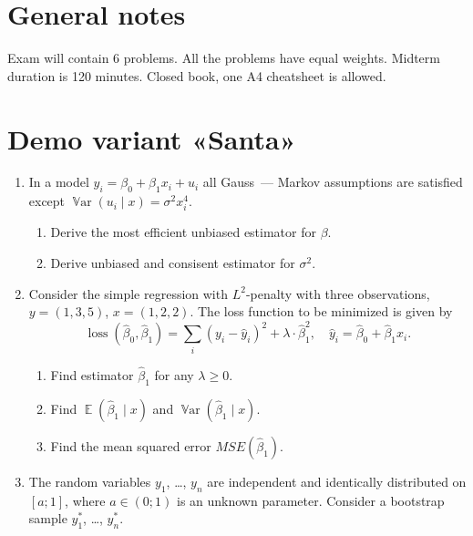 \documentclass[12pt]{article}
\DeclareMathOperator{\Var}{\mathbb{V}ar}
\DeclareMathOperator{\loss}{loss}
\DeclareMathOperator{\E}{\mathbb{E}}
\newcommand{\hb}{\hat\beta}
\begin{document}
\section*{General notes}

Exam will contain 6 problems. 
All the problems have equal weights. 
Midterm duration is 120 minutes. 
Closed book, one A4 cheatsheet is allowed.

\section*{Demo variant «Santa»}
\begin{enumerate}
    \item In a model $y_i = \beta_0 + \beta_1 x_i + u_i$ all Gauss~— Markov assumptions are satisfied except $\Var(u_i \mid x) = \sigma^2 x^4_i$.
    
    \begin{enumerate}
        \item Derive the most efficient unbiased estimator for $\beta$.
        \item Derive unbiased and consisent estimator for $\sigma^2$.
    \end{enumerate}


    \item Consider the simple regression with $L^2$-penalty with three observations, $y = (1, 3, 5)$, $x = (1, 2, 2)$.
    The loss function to be minimized is given by 
    \[
    \loss(\hb_0, \hb_1) = \sum_i (y_i - \hat y_i)^2 + \lambda \cdot \hb_1^2, \quad \hat y_i = \hb_0 + \hb_1 x_i.
    \] 
    
    \begin{enumerate}
        \item Find estimator $\hb_1$ for any $\lambda \geq 0$.
        \item Find $\E(\hb_1 \mid x)$ and $\Var(\hb_1 \mid x)$.
        \item Find the mean squared error $MSE(\hb_1)$.
    \end{enumerate}



    \item The random variables $y_1$, \dots, $y_n$ are independent and identically distributed on $[a; 1]$,
    where $a \in (0;1)$ is an unknown parameter. 
    Consider a bootstrap sample $y_1^*$, \dots, $y_n^*$.


\end{enumerate}
\end{document}
